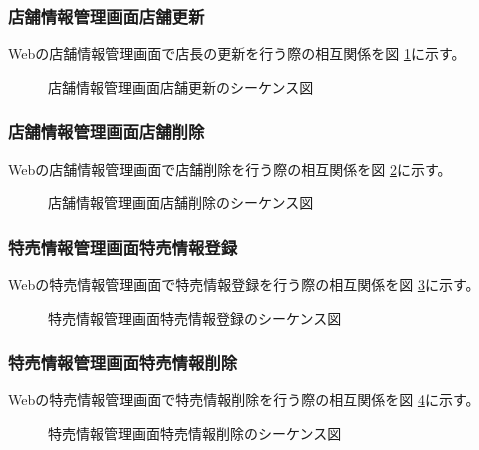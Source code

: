 \documentclass[a4j]{jarticle}
\begin{document}
  	\subsubsection{店舗情報管理画面店舗更新}
  	Webの店舗情報管理画面で店長の更新を行う際の相互関係を図 \ref{tab:oonishi3}に示す。
  	\begin{figure}[H]
  	\begin{center}
  	\caption{店舗情報管理画面店舗更新のシーケンス図}
  	\label{tab:oonishi3}
  	\end{center}
  	\end{figure}
  	\subsubsection{店舗情報管理画面店舗削除}
  	Webの店舗情報管理画面で店舗削除を行う際の相互関係を図 \ref{tab:oonishi4}に示す。
  	\begin{figure}[H]
  	\begin{center}
  	\caption{店舗情報管理画面店舗削除のシーケンス図}
  	\label{tab:oonishi4}
  	\end{center}
  	\end{figure}

  	\subsubsection{特売情報管理画面特売情報登録}
  	Webの特売情報管理画面で特売情報登録を行う際の相互関係を図 \ref{tab:oonishi21}に示す。
  	\begin{figure}[H]
  	\begin{center}
  	\caption{特売情報管理画面特売情報登録のシーケンス図}
  	\label{tab:oonishi21}
  	\end{center}
  	\end{figure}
  	\subsubsection{特売情報管理画面特売情報削除}
  	Webの特売情報管理画面で特売情報削除を行う際の相互関係を図 \ref{tab:oonishi22}に示す。
  	\begin{figure}[H]
  	\begin{center}
  	\caption{特売情報管理画面特売情報削除のシーケンス図}
  	\label{tab:oonishi22}
  	\end{center}
  	\end{figure}
\end{document}
